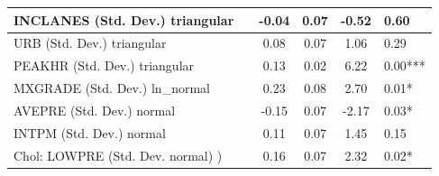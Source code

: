 \begin{table}
\begin{center}
\begin{tabular}{|l|l|c|c|c|l|}
			\hline
			INCLANES (Std. Dev.) triangular &  & -0.04 & 0.07 & -0.52 & 0.60 \\
			\hline
			URB (Std. Dev.) triangular &  & 0.08 & 0.07 & 1.06 & 0.29 \\
			\hline
			PEAKHR (Std. Dev.) triangular &  & 0.13 & 0.02 & 6.22 & 0.00*** \\
			\hline
			MXGRADE (Std. Dev.) ln_normal &  & 0.23 & 0.08 & 2.70 & 0.01* \\
			\hline
			AVEPRE (Std. Dev.) normal &  & -0.15 & 0.07 & -2.17 & 0.03* \\
			\hline
			INTPM (Std. Dev.) normal &  & 0.11 & 0.07 & 1.45 & 0.15 \\
			\hline
			 Chol: LOWPRE (Std. Dev. normal) ) &  & 0.16 & 0.07 & 2.32 & 0.02* \\
			\hline
		\end{tabular}
	\end{center}
\end{table}